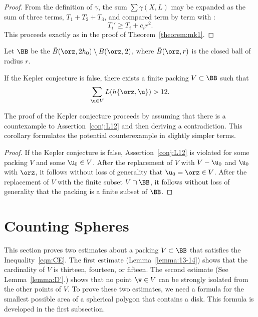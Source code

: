 \begin{proof}
From the definition of $\gamma$, the sum $\sum \gamma(X,L)$ may be
expanded as the sum of three terms, $T_1+T_2+T_3$, and compared term
by term with :
\[  
T_i' \ge T_i + c_i r^2.
\] 
This proceeds exactly as in the proof of Theorem~\ref{theorem:mk1}.
\end{proof}

\begin{definition}[$\BB$] 
Let $\BB$ be the
 $\bar B(\orz,2h_0)\setminus B(\orz,2)$, where
$\bar B(\orz,r)$ is the closed ball of radius $r$.
\end{definition}


\begin{corollary}\label{cor:CE} 
  If the Kepler conjecture is false, there exists a finite packing
  $V\subset\BB$ such that
\begin{equation}\label{eqn:CE} 
\sum_{ \u\in V} L(h\{\orz, \u\}) > 12.
\end{equation}
\end{corollary}

The proof of the Kepler conjecture proceeds by assuming that there is
a countexample to Assertion~\ref{conj:L12} and then deriving a contradiction.
This corollary formulates the potential counterexample in slightly simpler terms.

\begin{proof} If the Kepler conjecture is false,
Assertion~\ref{conj:L12} is violated for some packing $ V$ and some
$ \u_0\in V$.  After the replacement of $ V$ with $ V - \u_0$ and $
\u_0$ with $\orz$, it follows without loss of generality that $
\u_0=\orz\in V$.  After the replacement of $ V$ with the finite
subset
$V\cap \BB$,
it follows without loss of generality that the packing is a finite subset of $\BB$.
\end{proof}



\section{Counting Spheres}

This section proves two estimates about a packing $V\subset \BB$ that
satisfies the Inequality~\ref{eqn:CE}.  The first estimate
(Lemma~\ref{lemma:13-14}) shows that the cardinality of $V$ is thirteen,
fourteen, or fifteen.  The second estimate (See Lemma~\ref{lemma:D'}.)  shows
that no point $\v\in V$ can be strongly isolated from the other points
of $V$.    To prove these two estimates, we need a formula for the smallest
possible area of a spherical polygon that contains a disk.  This formula is
developed in the first subsection.


